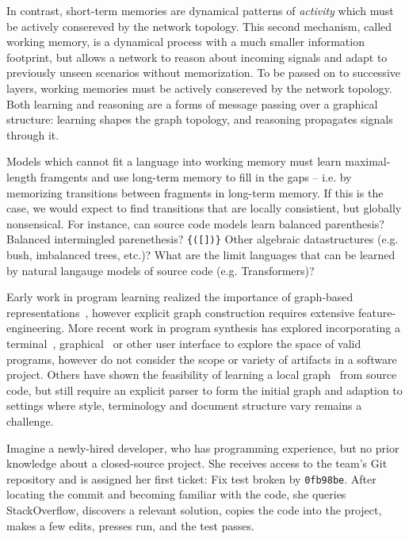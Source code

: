 \documentclass[10pt]{article}
\begin{document}
In contrast, short-term memories are dynamical patterns of \textit{activity} which must be actively consereved by the network topology. This second mechanism, called working memory, is a dynamical process with a much smaller information footprint, but allows a network to reason about incoming signals and adapt to previously unseen scenarios without memorization. To be passed on to successive layers, working memories must be actively consereved by the network topology. Both learning and reasoning are a forms of message passing over a graphical structure: learning shapes the graph topology, and reasoning propagates signals through it.

Models which cannot fit a language into working memory must learn maximal-length framgents and use long-term memory to fill in the gaps -- i.e. by memorizing transitions between fragments in long-term memory. If this is the case, we would expect to find transitions that are locally consistient, but globally nonsensical. For instance, can source code models learn balanced parenthesis? Balanced intermingled parenethesis? \texttt{\{([])\}} Other algebraic datastructures (e.g. bush, imbalanced trees, etc.)? What are the limit languages that can be learned by natural langauge models of source code (e.g. Transformers)?

Early work in program learning realized the importance of graph-based representations~\cite{allamanis2017learning}, however explicit graph construction requires extensive feature-engineering. More recent work in program synthesis has explored incorporating a terminal~\cite{ellis2019write}, graphical~\cite{walke2020learning} or other user interface to explore the space of valid programs, however do not consider the scope or variety of artifacts in a software project. Others have shown the feasibility of learning a local graph~\cite{johnson2020learning} from source code, but still require an explicit parser to form the initial graph and adaption to settings where style, terminology and document structure vary remains a challenge.

Imagine a newly-hired developer, who has programming experience, but no prior knowledge about a closed-source project. She receives access to the team's Git repository and is assigned her first ticket: Fix test broken by \texttt{0fb98be}. After locating the commit and becoming familiar with the code, she queries StackOverflow, discovers a relevant solution, copies the code into the project, makes a few edits, presses run, and the test passes.
\end{document}
